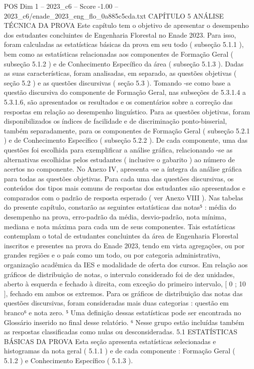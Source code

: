 \begin{textsample}{POS Dim 1 – 2023\_c6 – Score -1.00 – 2023\_c6/enade\_2023\_eng\_flo\_0a885c5cda.txt}  \label{ex:f1_pos_233}
CAPÍTULO 5 ANÁLISE TÉCNICA DA PROVA Este capítulo tem o objetivo de apresentar o desempenho dos estudantes concluintes de Engenharia Florestal no Enade 2023.
Para isso, foram calculadas as estatísticas básicas da prova em seu todo ( subseção 5.1.1 ), bem como as estatísticas relacionadas aos componentes de Formação Geral ( subseção 5.1.2 ) e de Conhecimento Específico da área ( subseção 5.1.3 ).
Dadas as suas características, foram analisadas, em separado, as questões objetivas ( seção 5.2 ) e as questões discursivas ( seção 5.3 ).
Tomando -se como base a questão discursiva do componente de Formação Geral, nas subseções de 5.3.1.4 a 5.3.1.6, são apresentados os resultados e os comentários sobre a correção das respostas em relação ao desempenho linguístico.
Para as questões objetivas, foram disponibilizados os índices de facilidade e de discriminação ponto-bisserial, também separadamente, para os componentes de Formação Geral ( subseção 5.2.1 ) e de Conhecimento Específico ( subseção 5.2.2 ).
De cada componente, uma das questões foi escolhida para exemplificar a análise gráfica, relacionando -se as alternativas escolhidas pelos estudantes ( inclusive o gabarito ) ao número de acertos no componente.
No Anexo IV, apresenta -se a íntegra da análise gráfica para todas as questões objetivas.
Para cada uma das questões discursivas, os conteúdos dos tipos mais comuns de respostas dos estudantes são apresentados e comparados com o padrão de resposta esperado ( ver Anexo VIII ).
Nas tabelas do presente capítulo, constarão as seguintes estatísticas das notas⁵ : média do desempenho na prova, erro-padrão da média, desvio-padrão, nota mínima, mediana e nota máxima para cada um de seus componentes.
Tais estatísticas contemplam o total de estudantes concluintes da área de Engenharia Florestal inscritos e presentes na prova do Enade 2023, tendo em vista agregações, ou por grandes regiões e o país como um todo, ou por categoria administrativa, organização acadêmica da IES e modalidade de oferta dos cursos.
Em relação aos gráficos de distribuição de notas, o intervalo considerado foi de dez unidades, aberto à esquerda e fechado à direita, com exceção do primeiro intervalo, [ 0 ; 10 ], fechado em ambos os extremos.
Para os gráficos de distribuição das notas das questões discursivas, foram consideradas mais duas categorias : questão em branco⁶ e nota zero. ⁵ Uma definição dessas estatísticas pode ser encontrada no Glossário inserido no final desse relatório. ⁶ Nesse grupo estão incluídas também as respostas classificadas como nulas ou desconsideradas. 5.1 ESTATÍSTICAS BÁSICAS DA PROVA Esta seção apresenta estatísticas selecionadas e histogramas da nota geral ( 5.1.1 ) e de cada componente : Formação Geral ( 5.1.2 ) e Conhecimento Específico ( 5.1.3 ).

\end{textsample}

